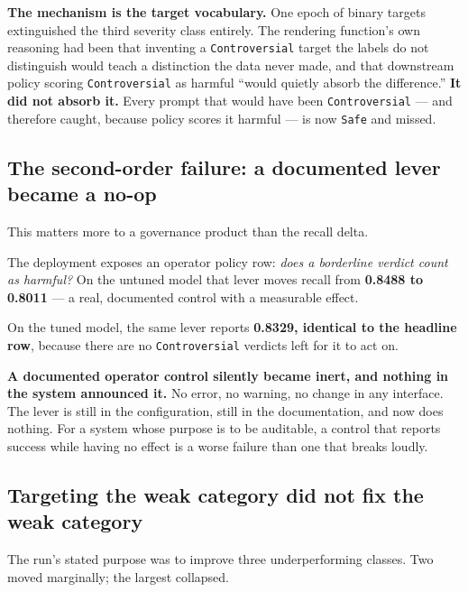 \documentclass[10pt]{article}
\begin{document}
\textbf{The mechanism is the target vocabulary.} One epoch of binary targets extinguished the third
severity class entirely. The rendering function's own reasoning had been that inventing a
\texttt{Controversial} target the labels do not distinguish would teach a distinction the data never made,
and that downstream policy scoring \texttt{Controversial} as harmful ``would quietly absorb the difference.''
\textbf{It did not absorb it.} Every prompt that would have been \texttt{Controversial} --- and therefore caught,
because policy scores it harmful --- is now \texttt{Safe} and missed.

\subsection{The second-order failure: a documented lever became a no-op}

This matters more to a governance product than the recall delta.

The deployment exposes an operator policy row: \emph{does a borderline verdict count as harmful?} On the
untuned model that lever moves recall from \textbf{0.8488 to 0.8011} --- a real, documented control with a
measurable effect.

On the tuned model, the same lever reports \textbf{0.8329, identical to the headline row}, because there
are no \texttt{Controversial} verdicts left for it to act on.

\textbf{A documented operator control silently became inert, and nothing in the system announced it.} No
error, no warning, no change in any interface. The lever is still in the configuration, still in the
documentation, and now does nothing. For a system whose purpose is to be auditable, a control that
reports success while having no effect is a worse failure than one that breaks loudly.

\subsection{Targeting the weak category did not fix the weak category}

The run's stated purpose was to improve three underperforming classes. Two moved marginally; the
largest collapsed.
\end{document}
